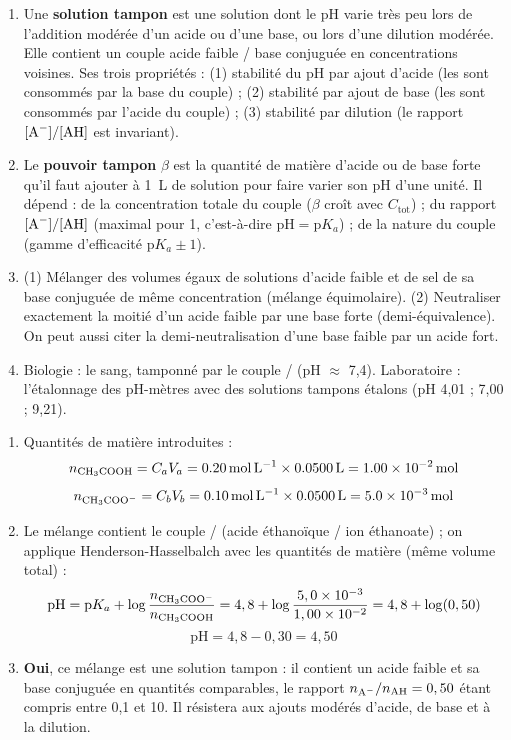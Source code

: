 \documentclass[11pt]{article}
\begin{document}
\begin{corrige}
\begin{enumerate}
  \item Une \textbf{solution tampon} est une solution dont le pH varie très peu lors de l'addition modérée d'un acide ou d'une base, ou lors d'une dilution modérée. Elle contient un couple acide faible / base conjuguée en concentrations voisines. Ses trois propriétés : (1) stabilité du pH par ajout d'acide (les  sont consommés par la base du couple) ; (2) stabilité par ajout de base (les  sont consommés par l'acide du couple) ; (3) stabilité par dilution (le rapport $[\ce{A-}]/[\ce{AH}]$ est invariant).
  \item Le \textbf{pouvoir tampon} $\beta$ est la quantité de matière d'acide ou de base forte qu'il faut ajouter à \SI{1}{L} de solution pour faire varier son pH d'une unité. Il dépend : de la concentration totale du couple ($\beta$ croît avec $C_{\text{tot}}$) ; du rapport $[\ce{A-}]/[\ce{AH}]$ (maximal pour 1, c'est-à-dire $\mathrm{pH} = \mathrm{p}K_a$) ; de la nature du couple (gamme d'efficacité $\mathrm{p}K_a \pm 1$).
  \item (1) Mélanger des volumes égaux de solutions d'acide faible et de sel de sa base conjuguée de même concentration (mélange équimolaire). (2) Neutraliser exactement la moitié d'un acide faible par une base forte (demi-équivalence). On peut aussi citer la demi-neutralisation d'une base faible par un acide fort.
  \item Biologie : le sang, tamponné par le couple / (pH $\approx$ 7,4). Laboratoire : l'étalonnage des pH-mètres avec des solutions tampons étalons (pH 4,01 ; 7,00 ; 9,21).
\end{enumerate}
\end{corrige}

\begin{corrige}
\begin{enumerate}
  \item Quantités de matière introduites :
  \[
  n_{\ce{CH3COOH}} = C_a V_a = \SI{0,20}{mol.L^{-1}} \times \SI{0,0500}{L} = \SI{1,00e-2}{mol}
  \]
  \[
  n_{\ce{CH3COO-}} = C_b V_b = \SI{0,10}{mol.L^{-1}} \times \SI{0,0500}{L} = \SI{5,0e-3}{mol}
  \]
  \item Le mélange contient le couple / (acide éthanoïque / ion éthanoate) ; on applique Henderson-Hasselbalch avec les quantités de matière (même volume total) :
  \[
  \mathrm{pH} = \mathrm{p}K_a + \log\frac{n_{\ce{CH3COO-}}}{n_{\ce{CH3COOH}}} = 4,8 + \log\frac{5,0\times10^{-3}}{1,00\times10^{-2}} = 4,8 + \log(0,50)
  \]
  \[
  \boxed{\mathrm{pH} = 4,8 - 0,30 = 4,50}
  \]
  \item \textbf{Oui}, ce mélange est une solution tampon : il contient un acide faible et sa base conjuguée en quantités comparables, le rapport $n_{\ce{A-}}/n_{\ce{AH}} = 0,50$ étant compris entre 0,1 et 10. Il résistera aux ajouts modérés d'acide, de base et à la dilution.
\end{enumerate}
\end{corrige}
\end{document}
